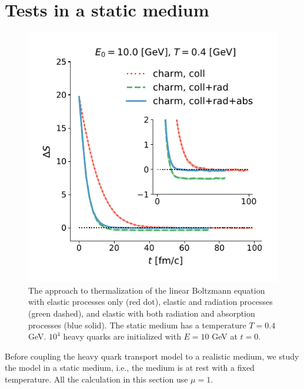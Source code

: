 \documentclass[aps, prc, reprint, amsmath, groupedaddress, nofootinbib]{revtex4-1}
\begin{document}
\section{Tests in a static medium}\label{section:test}
\begin{figure}
\includegraphics[width=\columnwidth]{thermalization.pdf}
\caption{The approach to thermalization of the linear Boltzmann equation with elastic processes only (red dot), elastic and radiation processes (green dashed), and elastic with both radiation and absorption processes (blue solid). The static medium has a temperature $T = 0.4$ GeV. $10^4$ heavy quarks are initialized with $E = 10$ GeV at $t = 0$.}\label{plots:thermalization}
\end{figure}

Before coupling the heavy quark transport model to a realistic medium, we study the model in a static medium, i.e., the medium is at rest with a fixed temperature.
All the calculation in this section use $\mu =1$.
\end{document}
